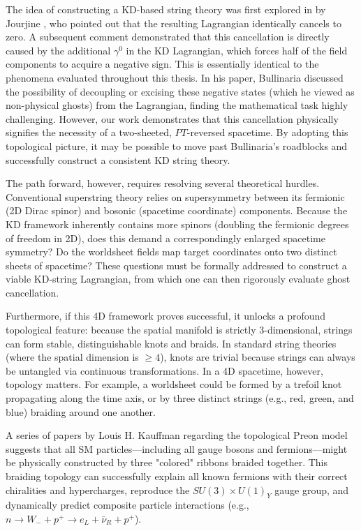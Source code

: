 The idea of constructing a KD-based string theory was first explored in by Jourjine \cite{Jourjine1986}, who pointed out that the resulting Lagrangian identically cancels to zero. A subsequent comment \cite{Bullinaria1987CommentOJ} demonstrated that this cancellation is directly caused by the additional $\gamma^0$ in the KD Lagrangian, which forces half of the field components to acquire a negative sign. This is essentially identical to the phenomena evaluated throughout this thesis. In his paper, Bullinaria discussed the possibility of decoupling or excising these negative states (which he viewed as non-physical ghosts) from the Lagrangian, finding the mathematical task highly challenging. However, our work demonstrates that this cancellation physically signifies the necessity of a two-sheeted, $PT$-reversed spacetime. By adopting this topological picture, it may be possible to move past Bullinaria's roadblocks and successfully construct a consistent KD string theory. 

The path forward, however, requires resolving several theoretical hurdles. Conventional superstring theory relies on supersymmetry between its fermionic (2D Dirac spinor) and bosonic (spacetime coordinate) components. Because the KD framework inherently contains more spinors (doubling the fermionic degrees of freedom in 2D), does this demand a correspondingly enlarged spacetime symmetry? Do the worldsheet fields map target coordinates onto two distinct sheets of spacetime? These questions must be formally addressed to construct a viable KD-string Lagrangian, from which one can then rigorously evaluate ghost cancellation.

Furthermore, if this 4D framework proves successful, it unlocks a profound topological feature: because the spatial manifold is strictly 3-dimensional, strings can form stable, distinguishable knots and braids. In standard string theories (where the spatial dimension is $\geq 4$), knots are trivial because strings can always be untangled via continuous transformations. In a 4D spacetime, however, topology matters. For example, a worldsheet could be formed by a trefoil knot propagating along the time axis, or by three distinct strings (e.g., red, green, and blue) braiding around one another. 

A series of papers by Louis H. Kauffman regarding the topological Preon model \cite{bilsonthompson2006topologicalmodelcompositepreons, Chester2025} suggests that all SM particles—including all gauge bosons and fermions—might be physically constructed by three "colored" ribbons braided together. This braiding topology can successfully explain all known fermions with their correct chiralities and hypercharges, reproduce the $SU(3)\times U(1)_Y$ gauge group, and dynamically predict composite particle interactions 
(e.g., $n \to W_- + p^+ \to e_L + \bar{\nu}_R + p^+$). 

